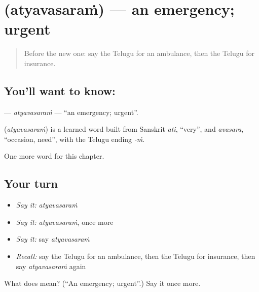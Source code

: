 \section[\texorpdfstring{\te{అత్యవసరం} (atyavasaraṁ)}{అత్యవసరం (atyavasaraṁ)}]{ (atyavasaraṁ) — an emergency; urgent}

\label{lesson:TE-C287-atyavasaram}



\begin{quote}
Before the new one: say the Telugu for an ambulance, then the Telugu for insurance.
\end{quote}

\subsection*{You'll want to know: }
\textbf{} — \emph{atyavasaraṁ} — \textquotedblleft{}an emergency; urgent\textquotedblright{}.

\begin{cousinweb}
\textbf{} (\emph{atyavasaraṁ}) is a learned word built from Sanskrit \emph{ati}, \textquotedblleft{}very\textquotedblright{}, and \emph{avasara}, \textquotedblleft{}occasion, need\textquotedblright{}, with the Telugu ending \emph{-ṁ}.
\end{cousinweb}

\begin{grammarlens}[title={What you've built}]
One more word for this chapter.
\end{grammarlens}

\subsection*{Your turn}
\begin{itemize}
\raggedright
  \item \emph{Say it:} \emph{atyavasaraṁ}
  \item \emph{Say it:} \emph{atyavasaraṁ}, once more
  \item \emph{Say it:} say \emph{atyavasaraṁ}
  \item \emph{Recall:} say the Telugu for an ambulance, then the Telugu for insurance, then say \emph{atyavasaraṁ} again
\end{itemize}

\begin{tcolorbox}[breakable,colback=teal!4,colframe=teal!35!black,title={Before you move on}]
What does  mean? (\textquotedblleft{}An emergency; urgent\textquotedblright{}.) Say it once more.
\end{tcolorbox}
